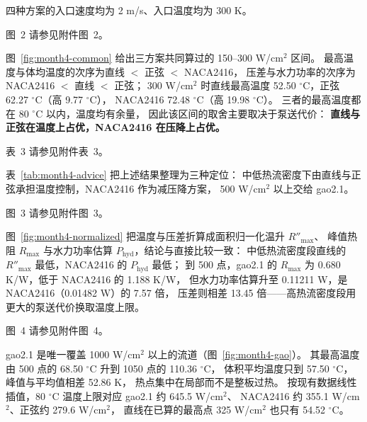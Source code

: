 \documentclass[stage2,fontset=fandol]{ydzjreport}
\makeatletter
\newcommand{\submissionnumber}[1]{\def\@currentlabel{#1}}
\makeatother
\begin{document}
四种方案的入口速度均为 2 m/s、入口温度均为 300 K。



\par\noindent \begingroup\submissionnumber{2}\label{fig:month4-common}\endgroup 图~2 请参见附件图~2。\par


图~\ref{fig:month4-common} 给出三方案共同算过的 150--300 W/cm$^2$ 区间。
最高温度与体均温度的次序为直线 $<$ 正弦 $<$ NACA2416，
压差与水力功率的次序为 NACA2416 $<$ 直线 $<$ 正弦；
300 W/cm$^2$ 时直线最高温度 52.50 $^\circ$C，正弦 62.27 $^\circ$C（高 9.77 $^\circ$C），
NACA2416 72.48 $^\circ$C（高 19.98 $^\circ$C）。
三者的最高温度都在 80 $^\circ$C 以内，温度均有余量，
因此该区间的取舍主要取决于泵送代价：
\textbf{直线与正弦在温度上占优，NACA2416 在压降上占优。}



\par\noindent \begingroup\submissionnumber{3}\label{tab:month4-advice}\endgroup 表~3 请参见附件表~3。\par


表~\ref{tab:month4-advice} 把上述结果整理为三种定位：
中低热流密度下由直线与正弦承担温度控制，NACA2416 作为减压降方案，
500 W/cm$^2$ 以上交给 gao2.1。


\par\noindent \begingroup\submissionnumber{3}\label{fig:month4-normalized}\endgroup 图~3 请参见附件图~3。\par


图~\ref{fig:month4-normalized} 把温度与压差折算成面积归一化温升 $R''_{\max}$、
峰值热阻 $R_{\max}$ 与水力功率估算 $P_{\mathrm{hyd}}$，结论与直接比较一致：
中低热流密度段直线的 $R''_{\max}$ 最低，NACA2416 的 $P_{\mathrm{hyd}}$ 最低；
到 500 点，gao2.1 的 $R_{\max}$ 为 0.680 K/W，低于 NACA2416 的 1.188 K/W，
但水力功率估算升至 0.11211 W，是 NACA2416（0.01482 W）的 7.57 倍，
压差则相差 13.45 倍——高热流密度段用更大的泵送代价换取温度上限。


\par\noindent \begingroup\submissionnumber{4}\label{fig:month4-gao}\endgroup 图~4 请参见附件图~4。\par


gao2.1 是唯一覆盖 1000 W/cm$^2$ 以上的流道（图~\ref{fig:month4-gao}）。
其最高温度由 500 点的 68.50 $^\circ$C 升到 1050 点的 110.36 $^\circ$C，
体积平均温度只到 57.50 $^\circ$C，峰值与平均值相差 52.86 K，
热点集中在局部而不是整板过热。
按现有数据线性插值，80 $^\circ$C 温度上限对应 gao2.1 约 645.5 W/cm$^2$、
NACA2416 约 355.1 W/cm$^2$、正弦约 279.6 W/cm$^2$，
直线在已算的最高点 325 W/cm$^2$ 也只有 54.52 $^\circ$C。
\end{document}
